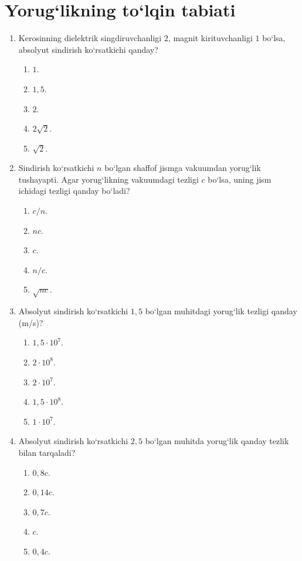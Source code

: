 \section{ Yorug‘likning to‘lqin tabiati}

\begin{enumerate}

\item Kerosinning dielektrik singdiruvchanligi $2$, magnit kirituvchanligi $1$ bo‘lsa, absolyut sindirish ko‘rsatkichi qanday?
\begin{enumerate}[label=\Alph*)]
\item $1$.
\item $1,5$.
\item $2$.
\item $2\sqrt{2}$.
\item $\sqrt{2}$.
\end{enumerate}

\item Sindirish ko‘rsatkichi $n$ bo‘lgan shaffof jismga vakuumdan yorug‘lik tushayapti. Agar yorug‘likning vakuumdagi tezligi $c$ bo‘lsa, uning jism ichidagi tezligi qanday bo‘ladi?
\begin{enumerate}[label=\Alph*)]
\item $c/n$.
\item $nc$.
\item $c$.
\item $n/c$.
\item $\sqrt{nc}$.
\end{enumerate}

\item Absolyut sindirish ko‘rsatkichi $1,5$ bo‘lgan muhitdagi yorug‘lik tezligi qanday (m/s)?
\begin{enumerate}[label=\Alph*)]
\item $1,5\cdot10^7$.
\item $2\cdot10^8$.
\item $2\cdot10^7$.
\item $1,5\cdot10^8$.
\item $1\cdot10^7$.
\end{enumerate}

\item Absolyut sindirish ko‘rsatkichi $2,5$ bo‘lgan muhitda yorug‘lik qanday tezlik bilan tarqaladi?
\begin{enumerate}[label=\Alph*)]
\item $0,8c$.
\item $0,14c$.
\item $0,7c$.
\item $c$.
\item $0,4c$.
\end{enumerate}


\end{enumerate}
